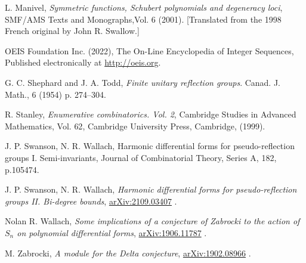 \documentclass[11pt,oneside]{amsart}
\theoremstyle{definition}
\numberwithin{equation}{section}
\begin{document}
\begin{thebibliography}{999}
 L. Manivel,
\textit{Symmetric functions, {S}chubert polynomials and degeneracy loci},
SMF/AMS Texts and Monographs,Vol. {6} (2001).
[Translated from the 1998 French original by John R. Swallow.]

 OEIS Foundation Inc. (2022),
The On-Line Encyclopedia of Integer Sequences, Published electronically at
\href{http://oeis.org}{http://oeis.org}.

 G. C. Shephard and J. A. Todd,
\textit{Finite unitary reflection groups}.
Canad. J. Math., 6 (1954) p. 274--304.

 R. Stanley,
\textit{Enumerative combinatorics. {V}ol. 2},
{Cambridge Studies in Advanced Mathematics}, Vol. {62},
{Cambridge University Press, Cambridge}, (1999).

 J. P. Swanson, N. R. Wallach,
Harmonic differential forms for pseudo-reflection groups I. Semi-invariants,
Journal of Combinatorial Theory, Series A, 182, p.105474.

 J. P. Swanson, N. R. Wallach,
\textit{Harmonic differential forms for pseudo-reflection groups II. Bi-degree bounds},
\href{https://arxiv.org/abs/2109.03407}{arXiv:2109.03407} .

 Nolan R. Wallach,
\textit{Some implications of a conjecture of Zabrocki
to the action of $S_n$ on polynomial differential forms},
\href{https://arxiv.org/abs/1906.11787}{arXiv:1906.11787} .

 M. Zabrocki,
\textit{A module for the Delta conjecture},
\href{https://arxiv.org/abs/1902.08966}{arXiv:1902.08966} .

\end{thebibliography}
\end{document}
